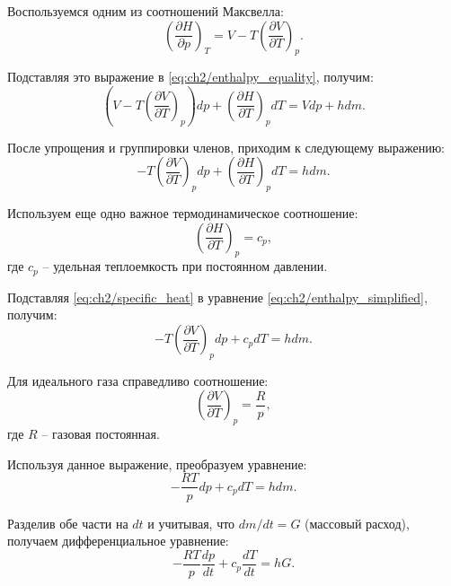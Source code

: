 Воспользуемся одним из соотношений Максвелла:
\begin{equation}
\label{eq:ch2/maxwell_relation}
    \left(
    \frac{\partial H}{\partial p}
    \right)_T = V - T \left(
    \frac{\partial V}{\partial T}
    \right)_p.
\end{equation}

Подставляя это выражение в \eqref{eq:ch2/enthalpy_equality}, получим:
\begin{equation}
\label{eq:ch2/enthalpy_substitution}
    \left( V - T \left(
        \frac{\partial V}{\partial T}
        \right)_p \right) dp + \left(
    \frac{\partial H}{\partial T}
    \right)_p dT = Vdp + hdm.
\end{equation}

После упрощения и группировки членов, приходим к следующему выражению:
\begin{equation}
\label{eq:ch2/enthalpy_simplified}
    -T \left(
    \frac{\partial V}{\partial T}
    \right)_p dp + \left(
    \frac{\partial H}{\partial T}
    \right)_p dT = hdm.
\end{equation}

Используем еще одно важное термодинамическое соотношение:
\begin{equation}
\label{eq:ch2/specific_heat}
    \left(
    \frac{\partial H}{\partial T}
    \right)_p = c_p,
\end{equation}
где $c_p$ -- удельная теплоемкость при постоянном давлении.

Подставляя \eqref{eq:ch2/specific_heat} в уравнение \eqref{eq:ch2/enthalpy_simplified}, получим:
\begin{equation}
\label{eq:ch2/enthalpy_final}
    -T \left(
    \frac{\partial V}{\partial T}
    \right)_p dp + c_p dT = hdm.
\end{equation}

Для идеального газа справедливо соотношение:
\begin{equation}
\label{eq:ch2/ideal_gas_relation}
    \left(\frac{\partial V}{\partial T}\right)_p = \frac{R}{p},
\end{equation}
где $R$ -- газовая постоянная.

Используя данное выражение, преобразуем уравнение:
\begin{equation}
\label{eq:ch2/pressure_temp_relation}
    -\frac{RT}{p} dp + c_p dT = h dm.
\end{equation}

Разделив обе части на $dt$ и учитывая, что $dm/dt = G$ (массовый расход), получаем дифференциальное уравнение:
\begin{equation}
\label{eq:ch2/differential_equation}
    -\frac{RT}{p} \frac{dp}{dt} + c_p \frac{dT}{dt} = hG.
\end{equation}

